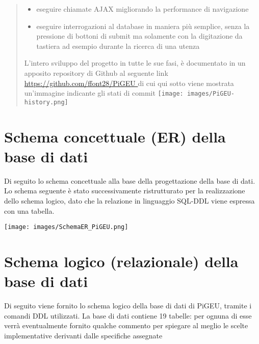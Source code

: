 \documentclass{article}
\begin{document}
\begin{abstract}
\begin{itemize}
\begin{itemize}
                \item eseguire chiamate AJAX migliorando la performance di navigazione
                \item eseguire interrogazioni al database in maniera più semplice, senza la pressione di bottoni di submit ma solamente con la digitazione da tastiera ad esempio durante la ricerca di una utenza
            \end{itemize}
        \end{itemize}
        L'intero sviluppo del progetto in tutte le sue fasi, è documentato in un apposito repository di Github al seguente link \url{https://github.com/ffont28/PiGEU } di cui qui sotto viene mostrata un'immagine indicante gli stati di commit
        \texttt{[image: images/PiGEU-history.png]}
    \end{abstract}

    \section{Schema concettuale (ER) della base di dati}
    Di seguito lo schema concettuale alla base della progettazione della base di dati.
    Lo schema seguente è stato successivamente ristrutturato per la realizzazione dello schema logico, dato che la relazione in linguaggio SQL-DDL viene espressa con una tabella.


    \texttt{[image: images/SchemaER\_PiGEU.png]}

    \section{Schema logico (relazionale) della base di dati}
    Di seguito viene fornito lo schema logico della base di dati di PiGEU, tramite i comandi DDL utilizzati. La base di dati contiene 19 tabelle: per ognuna di esse verrà eventualmente fornito qualche commento per spiegare al meglio le scelte implementative derivanti dalle specifiche assegnate
    \pagebreak

\end{document}
